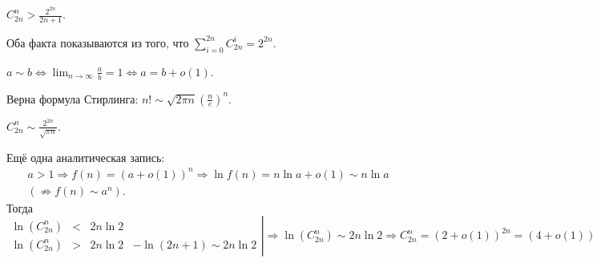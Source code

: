 \begin{claim}
  $C_{2n}^{n} > \frac{2^{2n}}{2n+1}$.
\end{claim}

\begin{remark*}
  Оба факта показываются из того, что $\sum_{i=0}^{2n}C_{2n}^{i} = 2^{2n}$.
\end{remark*}

\begin{define*}
  $a \sim b \Leftrightarrow \lim_{n\to\infty}\frac{a}{b} = 1 \Leftrightarrow a = b + o(1)$.
\end{define*}

\begin{remark*}
  Верна формула Стирлинга: $\boxed{n! \sim \sqrt{2\pi n}\left( \frac{n}{e} \right)^n}$.
\end{remark*}

\begin{claim}
  $C_{2n}^{n} \sim \frac{2^{2n}}{\sqrt{\pi n}}$.
\end{claim}

\begin{remark*}
  Ещё одна аналитическая запись:
  \begin{align*}
	a > 1  \Rightarrow	f(n) = (a+o(1))^n \Rightarrow \ln{f(n)} = n\ln{a+o(1)} \sim n\ln{a} \\
	(\nRightarrow f(n) \sim a^n).
  \end{align*}
  Тогда
  $
  \left.
  \begin{aligned}
	\ln(C_{2n}^{n}) &<&2n\ln2 &\\
	\ln(C_{2n}^{n}) &>&2n\ln2 &- \ln(2n+1) \sim 2n\ln2
  \end{aligned}
  \right|
  \Rightarrow \ln(C_{2n}^{n}) \sim 2n\ln2  \Rightarrow C_{2n}^{n} = (2 + o(1))^{2n} = (4 + o(1))^n
  $
\end{remark*}

